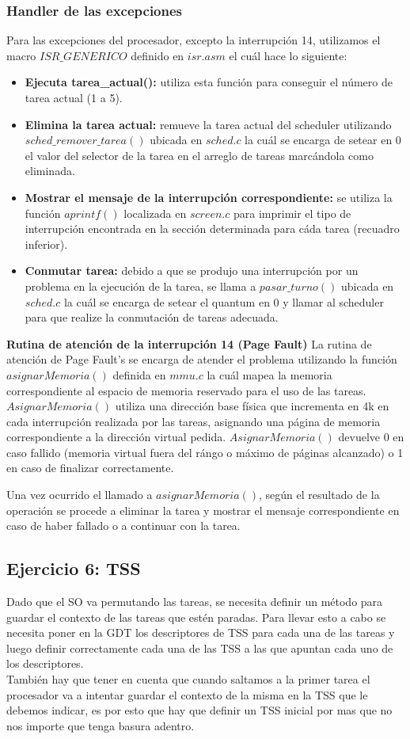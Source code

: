 \documentclass[a4paper,10pt,twoside]{article}
\begin{document}
\subsubsection{Handler de las excepciones}
Para las excepciones del procesador, excepto la interrupción 14, utilizamos el macro $ISR\_GENERICO$ definido en $isr.asm$ el cuál hace lo siguiente:
\begin{itemize}
\item \textbf{Ejecuta tarea\_actual():} utiliza esta función para conseguir el número de tarea actual (1 a 5).
\item \textbf{Elimina la tarea actual:} remueve la tarea actual del scheduler utilizando $sched\_remover\_tarea()$ ubicada en $sched.c$ la cuál se encarga de setear en 0 el valor del selector de la tarea en el arreglo de tareas marcándola como eliminada.
\item \textbf{Mostrar el mensaje de la interrupción correspondiente:} se utiliza la función $aprintf()$ localizada en $screen.c$ para imprimir el tipo de interrupción encontrada en la sección determinada para cáda tarea (recuadro inferior).
\item \textbf{Conmutar tarea:} debido a que se produjo una interrupción por un problema en la ejecución de la tarea, se llama a $pasar\_turno()$ ubicada en $sched.c$ la cuál se encarga de setear el quantum en 0 y llamar al scheduler para que realize la conmutación de tareas adecuada.
\end{itemize}

\textbf{Rutina de atención de la interrupción 14 (Page Fault)}
La rutina de atención de Page Fault's se encarga de atender el problema utilizando la función $asignarMemoria()$ definida en $mmu.c$ la cuál mapea la memoria correspondiente al espacio de memoria reservado para el uso de las tareas. $AsignarMemoria()$ utiliza una dirección base física que incrementa en 4k en cada interrupción realizada por las tareas, asignando una página de memoria correspondiente a la dirección virtual pedida. $AsignarMemoria()$ devuelve 0 en caso fallido (memoria virtual fuera del rángo o máximo de páginas alcanzado) o 1 en caso de finalizar correctamente.

Una vez ocurrido el llamado a $asignarMemoria()$, según el resultado de la operación se procede a eliminar la tarea y mostrar el mensaje correspondiente en caso de haber fallado o a continuar con la tarea.

\subsection{Ejercicio 6: TSS}
Dado que el SO va permutando las tareas, se necesita definir un método para guardar el contexto de las tareas que estén paradas.
Para llevar esto a cabo se necesita poner en la GDT los descriptores de TSS para cada una de las tareas y luego definir correctamente cada una de las TSS a las que apuntan cada uno de los descriptores.\\
También hay que tener en cuenta que cuando saltamos a la primer tarea el procesador va a intentar guardar el contexto de la misma en la TSS que le debemos indicar, es por esto que hay que definir un TSS inicial por mas que no nos importe que tenga basura adentro.
\end{document}
